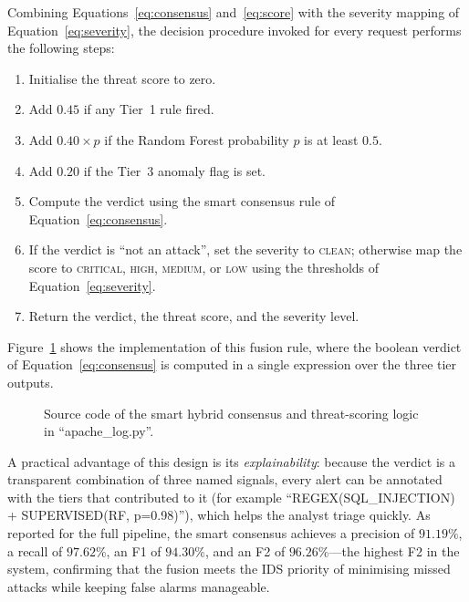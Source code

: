 \documentclass[12pt,a4paper]{report}
\begin{document}
Combining Equations~\eqref{eq:consensus} and~\eqref{eq:score} with the
severity mapping of Equation~\eqref{eq:severity}, the decision procedure
invoked for every request performs the following steps:

\begin{enumerate}[leftmargin=1.8em, itemsep=2pt]
  \item Initialise the threat score to zero.
  \item Add $0.45$ if any Tier~1 rule fired.
  \item Add $0.40 \times p$ if the Random Forest probability $p$ is at least
        $0.5$.
  \item Add $0.20$ if the Tier~3 anomaly flag is set.
  \item Compute the verdict using the smart consensus rule of
        Equation~\eqref{eq:consensus}.
  \item If the verdict is ``not an attack'', set the severity to
        \textsc{clean}; otherwise map the score to \textsc{critical},
        \textsc{high}, \textsc{medium}, or \textsc{low} using the thresholds
        of Equation~\eqref{eq:severity}.
  \item Return the verdict, the threat score, and the severity level.
\end{enumerate}

Figure~\ref{fig:code-consensus} shows the implementation of this fusion rule,
where the boolean verdict of Equation~\eqref{eq:consensus} is computed in a
single expression over the three tier outputs.

\begin{figure}[ht]
  \centering
  \caption{Source code of the smart hybrid consensus and threat-scoring logic
           in ``apache\_log.py''.}
  \label{fig:code-consensus}
\end{figure}

A practical advantage of this design is its \emph{explainability}: because
the verdict is a transparent combination of three named signals, every alert
can be annotated with the tiers that contributed to it (for example
``REGEX(SQL\_INJECTION) + SUPERVISED(RF, p=0.98)''), which helps the
analyst triage quickly. As reported for the full pipeline, the smart
consensus achieves a precision of $91.19\%$, a recall of $97.62\%$, an F1 of
$94.30\%$, and an F2 of $96.26\%$---the highest F2 in the system, confirming
that the fusion meets the IDS priority of minimising missed attacks while
keeping false alarms manageable.
\end{document}
